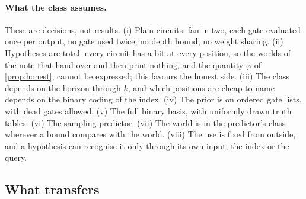 \paragraph{What the class assumes.} These are decisions, not results. (i) Plain circuits: fan-in two, each
gate evaluated once per output, no gate used twice, no depth bound, no weight sharing. (ii) Hypotheses are
total: every circuit has a bit at every position, so the worlds of the note that hand over and then print
nothing, and the quantity $\varphi$ of \cref{prop:honest}, cannot be expressed; this favours the honest side.
(iii) The class depends on the horizon through $k$, and which positions are cheap to name depends on the
binary coding of the index. (iv) The prior is on ordered gate lists, with dead gates allowed. (v) The full
binary basis, with uniformly drawn truth tables. (vi) The sampling predictor. (vii) The world is in the
predictor's class wherever a bound compares with the world. (viii) The use is fixed from outside, and a
hypothesis can recognise it only through its own input, the index or the query.

\subsection{What transfers}

